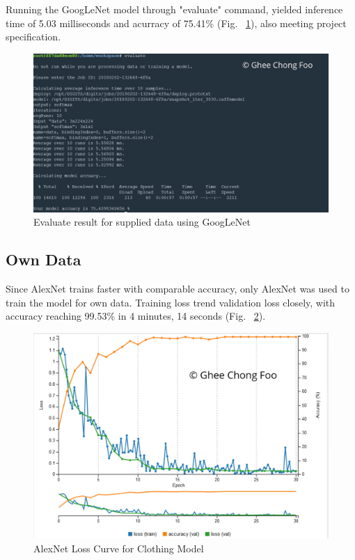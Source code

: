 \documentclass[10pt,journal,compsoc]{IEEEtran}
\begin{document}
Running the GoogLeNet model through "evaluate" command, yielded inference time of 5.03 milliseconds and acurracy of 75.41\% (Fig. ~\ref{fig:evaluate_GooLeNet}), also meeting project specification.

\begin{figure}[thpb]
      \centering
      \includegraphics[width=\linewidth]{evaluate_GooLeNet}
      \caption{Evaluate result for supplied data using GoogLeNet}
      \label{fig:evaluate_GooLeNet}
\end{figure}

\subsection{Own Data}
Since AlexNet trains faster with comparable accuracy, only AlexNet was used to train the model for own data.  Training loss trend validation loss closely, with accuracy reaching 99.53\% in 4 minutes, 14 seconds (Fig. ~\ref{fig:loss_curve_clothing}).\linebreak

\begin{figure}[thpb]
      \centering
      \includegraphics[width=\linewidth]{loss_curve_clothing}
      \caption{AlexNet Loss Curve for Clothing Model}
      \label{fig:loss_curve_clothing}
\end{figure}
\end{document}
